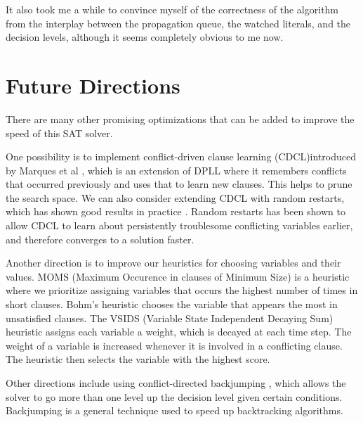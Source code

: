 \documentclass[11pt]{article}
\begin{document}
It also took me a while to convince myself of the correctness of the algorithm from the interplay between the propagation queue, the watched literals, and the decision levels, although it seems completely obvious to me now.

\section{Future Directions}

There are many other promising optimizations that can be added to improve the speed of this SAT solver. 

One possibility is to implement conflict-driven clause learning (CDCL)introduced by Marques et al \cite{handbook_sat}, which is an extension of DPLL where it remembers conflicts that occurred previously and uses that to learn new clauses. This helps to prune the search space. We can also consider extending CDCL with random restarts, which has shown good results in practice \cite{restarts}. Random restarts has been shown to allow CDCL to learn about persistently troublesome conflicting variables earlier, and therefore converges to a solution faster.

Another direction is to improve our heuristics for choosing variables and their values. MOMS (Maximum Occurence in clauses of Minimum Size) is a heuristic where we prioritize assigning variables that occurs the highest number of times in short clauses. Bohm's heuristic chooses the variable that appears the most in unsatisfied clauses. The VSIDS (Variable State Independent Decaying Sum) heuristic assigns each variable a weight, which is decayed at each time step. The weight of a variable is increased whenever it is involved in a conflicting clause. The heuristic then selects the variable with the highest score.

Other directions include using conflict-directed backjumping \cite{backtrack}, which allows the solver to go more than one level up the decision level given certain conditions. Backjumping is a general technique used to speed up backtracking algorithms. 

\newpage



\end{document}

